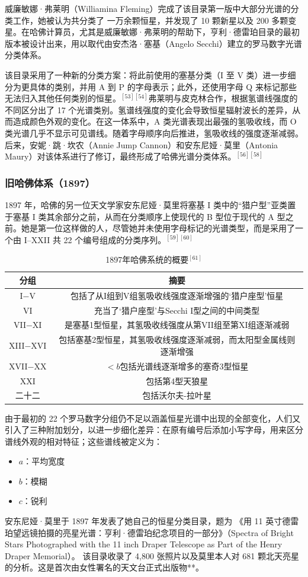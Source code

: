 威廉敏娜·弗莱明（Williamina Fleming）完成了该目录第一版中大部分光谱的分类工作，她被认为共分类了 一万余颗恒星，并发现了 10 颗新星以及 200 多颗变星。在哈佛计算员，尤其是威廉敏娜·弗莱明的帮助下，亨利·德雷珀目录的最初版本被设计出来，用以取代由安杰洛·塞基（Angelo Secchi）建立的罗马数字光谱分类体系。

该目录采用了一种新的分类方案：将此前使用的塞基分类（I 至 V 类）进一步细分为更具体的类别，并用 A 到 P 的字母表示；此外，还使用字母 Q 来标记那些无法归入其他任何类别的恒星。$^{[53][54]}$弗莱明与皮克林合作，根据氢谱线强度的不同区分出了 17 个光谱类别。氢谱线强度的变化会导致恒星辐射波长的差异，从而造成颜色外观的变化。在这一体系中，A 类光谱表现出最强的氢吸收线，而 O 类光谱几乎不显示可见谱线。随着字母顺序向后推进，氢吸收线的强度逐渐减弱。后来，安妮·跳·坎农（Annie Jump Cannon）和安东尼娅·莫里（Antonia Maury）对该体系进行了修订，最终形成了哈佛光谱分类体系。$^{[56][58]}$
\subsubsection{旧哈佛体系（1897）}
1897 年，哈佛的另一位天文学家安东尼娅·莫里将塞基 I 类中的“猎户型”亚类置于塞基 I 类其余部分之前，从而在分类顺序上使现代的 B 型位于现代的 A 型之前。她是第一位这样做的人，尽管她并未使用字母标记的光谱类型，而是采用了一个由 I–XXII 共 22 个编号组成的分类序列。$^{[59][60]}$
\begin{table}[ht]
\centering
\caption{1897年哈佛系统的概要$^{[61]}$}\label{tab_Stcl3}
\begin{tabular}{|c|c|}
\hline
\textbf{分组} & \textbf{摘要}\\
\hline
I−V & 包括了从I组到V组氢吸收线强度逐渐增强的‘猎户座型’恒星\\
\hline
VI & 充当了‘猎户座型’与Secchi I型之间的中间类型\\
\hline
VII−XI & 是塞基1型恒星，其氢吸收线强度从第VII组至第XI组逐渐减弱\\
\hline
XIII−XVI & 包括塞基2型恒星，其氢吸收线强度逐渐减弱，而太阳型金属线则逐渐增强\\
\hline
XVII−XX & $<b$包括光谱线逐渐增多的塞奇3型恒星\\
\hline
XXI & 包括第4型天狼星\\
\hline
二十二 & 包括沃尔夫-拉叶星\\
\hline
\end{tabular}
\end{table}
由于最初的 22 个罗马数字分组仍不足以涵盖恒星光谱中出现的全部变化，人们又引入了三种附加划分，以进一步细化差异：在原有编号后添加小写字母，用来区分谱线外观的相对特征；这些谱线被定义为：
\begin{itemize}
\item $a$：平均宽度
\item $b$：模糊
\item $c$：锐利
\end{itemize}
安东尼娅·莫里于 1897 年发表了她自己的恒星分类目录，题为
《用 11 英寸德雷珀望远镜拍摄的亮星光谱：亨利·德雷珀纪念项目的一部分》（Spectra of Bright Stars Photographed with the 11 inch Draper Telescope as Part of the Henry Draper Memorial）。
该目录收录了 4,800 张照片以及莫里本人对 681 颗北天亮星的分析。这是首次由女性署名的天文台正式出版物**。
